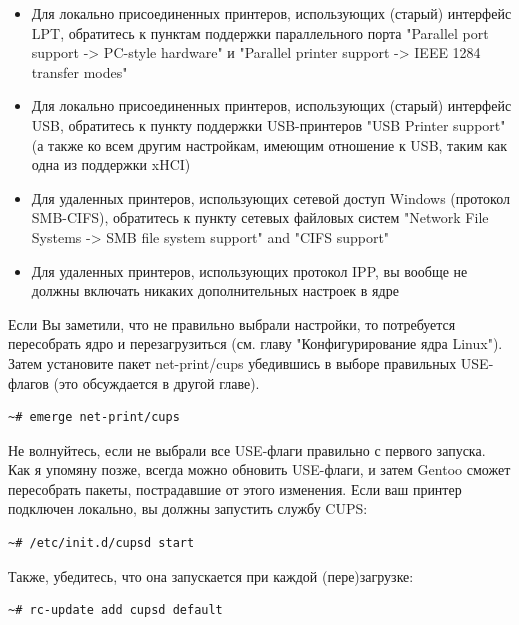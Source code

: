 \documentclass[10pt]{book}
\begin{document}
\begin{itemize}
 \item Для локально присоединенных принтеров, использующих (старый) интерфейс LPT, обратитесь к пунктам поддержки параллельного порта "Parallel port support -> PC-style hardware" и "Parallel printer support -> IEEE 1284 transfer modes"
 \item Для локально присоединенных принтеров, использующих (старый) интерфейс USB, обратитесь к пункту поддержки USB-принтеров "USB Printer support" (а также ко всем другим настройкам, имеющим отношение к USB, таким как одна из поддержки xHCI)
 \item Для удаленных принтеров, использующих сетевой доступ Windows (протокол SMB-CIFS), обратитесь к пункту сетевых файловых систем  "Network File Systems -> SMB file system support" and "CIFS support"
 \item Для удаленных принтеров, использующих протокол IPP, вы вообще не должны включать никаких дополнительных настроек в ядре
\end{itemize}

Если Вы заметили, что не правильно выбрали настройки, то потребуется пересобрать ядро и перезагрузиться (см. главу "Конфигурирование ядра Linux").
Затем установите пакет net-print/cups убедившись в выборе правильных USE-флагов (это обсуждается в другой главе).

\begin{tcolorbox}
\begin{lstlisting}
~# emerge net-print/cups
\end{lstlisting}
\end{tcolorbox}

Не волнуйтесь, если не выбрали все USE-флаги правильно с первого запуска. Как я упомяну позже, всегда можно обновить USE-флаги, и затем Gentoo сможет пересобрать пакеты, пострадавшие от этого изменения.
Если ваш принтер подключен локально, вы должны запустить службу CUPS:

\begin{tcolorbox}
\begin{lstlisting}
~# /etc/init.d/cupsd start
\end{lstlisting}
\end{tcolorbox}

Также, убедитесь, что она запускается при каждой (пере)загрузке:

\begin{tcolorbox}
\begin{lstlisting}
~# rc-update add cupsd default
\end{lstlisting}
\end{tcolorbox}
\end{document}
